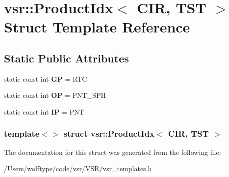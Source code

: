 \hypertarget{structvsr_1_1_product_idx_3_01_c_i_r_00_01_t_s_t_01_4}{\section{vsr\-:\-:Product\-Idx$<$ C\-I\-R, T\-S\-T $>$ Struct Template Reference}
\label{structvsr_1_1_product_idx_3_01_c_i_r_00_01_t_s_t_01_4}
}
\subsection*{Static Public Attributes}
\begin{DoxyCompactItemize}
\item 
\hypertarget{structvsr_1_1_product_idx_3_01_c_i_r_00_01_t_s_t_01_4_ab493db5e797f861725b4625ff0edcfce}{static const int {\bfseries G\-P} = R\-T\-C}\label{structvsr_1_1_product_idx_3_01_c_i_r_00_01_t_s_t_01_4_ab493db5e797f861725b4625ff0edcfce}

\item 
\hypertarget{structvsr_1_1_product_idx_3_01_c_i_r_00_01_t_s_t_01_4_a5bc166661616948c4aa2a56493f7fc46}{static const int {\bfseries O\-P} = P\-N\-T\-\_\-\-S\-P\-H}\label{structvsr_1_1_product_idx_3_01_c_i_r_00_01_t_s_t_01_4_a5bc166661616948c4aa2a56493f7fc46}

\item 
\hypertarget{structvsr_1_1_product_idx_3_01_c_i_r_00_01_t_s_t_01_4_a1f0ddd5a4488a9a169ccdca87c255afc}{static const int {\bfseries I\-P} = P\-N\-T}\label{structvsr_1_1_product_idx_3_01_c_i_r_00_01_t_s_t_01_4_a1f0ddd5a4488a9a169ccdca87c255afc}

\end{DoxyCompactItemize}
\subsubsection*{template$<$$>$ struct vsr\-::\-Product\-Idx$<$ C\-I\-R, T\-S\-T $>$}



The documentation for this struct was generated from the following file\-:\begin{DoxyCompactItemize}
\item 
/\-Users/wolftype/code/vsr/\-V\-S\-R/vsr\-\_\-templates.\-h\end{DoxyCompactItemize}
